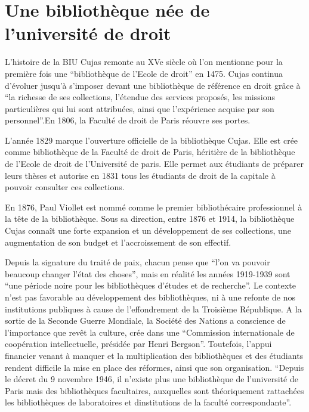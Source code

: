 \section[Naissance de la bibliothèque]{Une bibliothèque née de l'université de droit}
L'histoire de la BIU Cujas remonte au XVe siècle où l'on mentionne pour la première fois une  \enquote{bibliothèque de l'Ecole de droit} en 1475. Cujas continua d'évoluer jusqu'à s'imposer devant une bibliothèque de référence en droit grâce à \enquote{la richesse de ses collections, l'étendue des services proposés, les missions particulières qui lui sont attribuées, ainsi que l'expérience acquise par son personnel}.En 1806, la Faculté de droit de Paris réouvre ses portes.

L'année 1829 marque l'ouverture officielle de la bibliothèque Cujas. Elle est crée comme bibliothèque de la Faculté de droit de Paris, héritière de la bibliothèque de l'Ecole de droit de l'Université de paris. Elle permet aux étudiants de préparer leurs thèses et autorise en 1831 tous les étudiants de droit de la capitale à pouvoir consulter ces collections. 

En 1876, Paul Viollet est nommé comme le premier bibliothécaire professionnel à la tête de la bibliothèque. Sous sa direction, entre 1876 et 1914, la bibliothèque Cujas connaît une forte expansion et un développement de ses collections, une augmentation de son budget et l'accroissement de son effectif.   

Depuis la signature du traité de paix, chacun pense que \enquote{l'on va pouvoir beaucoup changer l'état des choses}, mais en réalité les années 1919-1939 sont \enquote{une période noire pour les bibliothèques d'études et de recherche}. Le contexte n'est pas favorable au développement des bibliothèques, ni à une refonte de nos institutions publiques à cause de l'effondrement de la Troisième République. A la sortie de la Seconde Guerre Mondiale, la Société des Nations a conscience de l'importance que revêt la culture, crée dans une \enquote{Commission internationale de coopération intellectuelle, présidée par Henri Bergson}. Toutefois, l'appui financier venant à manquer et la multiplication des bibliothèques et des étudiants rendent difficile la mise en place des réformes, ainsi que son organisation. \enquote{Depuis le décret du 9 novembre 1946, il n'existe plus une bibliothèque de l'université de Paris mais des bibliothèques facultaires, auxquelles sont théoriquement rattachées les bibliothèques de laboratoires et dinstitutions de la faculté correspondante}.

